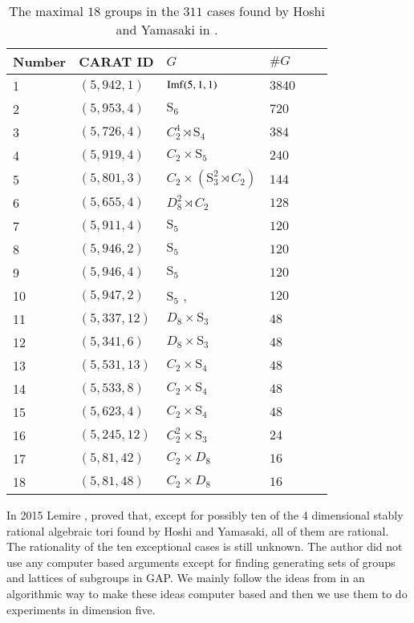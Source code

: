 \documentclass[12pt]{article}
\theoremstyle{plain}
\theoremstyle{definition}
\begin{document}
\begin{table}\label{tbl:18Max}
\centering
\begin{tabular}{llllll} 
Number & CARAT ID & $G$ & $\#G$\\ \hline
 1  & $(5,942,1)$ & ${\rm Imf}(5,1,1)$ & $3840$\\
2  & $(5,953,4)$ & $\mathrm{S}_6$ & $720$ \\
3  & $(5,726,4)$ & $C_2^4\rtimes \mathrm{S}_4$ & $384$  \\
4  & $(5,919,4)$ & $C_2\times \mathrm{S}_5$ & $240$ \\
5 & $(5,801,3)$ & $C_2\times (\mathrm{S}_3^2\rtimes C_2)$ & $144$ \\
6 & $(5,655,4)$ & $D_8^2\rtimes C_2$ & $128$ \\
7  & $(5,911,4)$ & $\mathrm{S}_5$ & $120$ \\
8 & $(5,946,2)$ & $\mathrm{S}_5$ & $120$ \\
9 & $(5,946,4)$ & $\mathrm{S}_5$ & $120$ \\
10 & $(5,947,2)$ & $\mathrm{S}_5$ ,\,\,\,\,\,\,\,\,\,\,\,\,\,\,\,\,\,\,\,\,\,\,\,\,\,\,\,\,\,\ & $120$ \\
11 & $(5,337,12)$ & $D_8\times \mathrm{S}_3$ & $48$ \\
12  & $(5,341,6)$ & $D_8\times \mathrm{S}_3$ & $48$ \\
13  & $(5,531,13)$ & $C_2\times \mathrm{S}_4$ & $48$ \\
14  & $(5,533,8)$ & $C_2\times \mathrm{S}_4$ & $48$ \\
15 & $(5,623,4)$ & $C_2\times \mathrm{S}_4$ & $48$\\
16   & $(5,245,12)$ & $C_2^2\times \mathrm{S}_3$ & $24$\\
17  & $(5,81,42)$ & $C_2\times D_8$ & $16$ \\
18  & $(5,81,48)$ & $C_2\times D_8$ & $16$ \\
\end{tabular}
\caption{The maximal $18$ groups 
in the  $311$ cases found by Hoshi and Yamasaki in \cite{Hoshi}.}
\end{table}

In 2015 Lemire \cite{Nicole1}, proved that, except for possibly ten of the 
4 dimensional stably rational algebraic tori found by Hoshi and Yamasaki, 
all of them are rational. The rationality of the ten exceptional cases is 
still unknown. The author did not use any computer based arguments except 
for finding generating sets of groups and lattices of subgroups in GAP. We 
mainly follow the ideas from \cite{Nicole1} in an algorithmic way to make
these ideas computer based and then we use them to do experiments in dimension
five.
\end{document}

